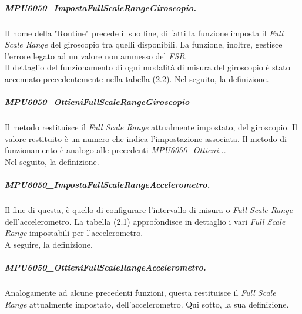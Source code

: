 \documentclass[11pt]{report}
\begin{document}
\subparagraph{MPU6050\_ImpostaFullScaleRangeGiroscopio.}
Il nome della "Routine" precede il suo fine, di fatti la funzione imposta il \textit{Full Scale Range} del giroscopio tra quelli disponibili. La funzione, inoltre, gestisce l'errore legato ad un valore non ammesso del \textit{FSR}.\\
Il dettaglio del funzionamento di ogni modalità di misura del giroscopio è stato accennato precedentemente nella tabella (2.2).
Nel seguito, la definizione.


\subparagraph{MPU6050\_OttieniFullScaleRangeGiroscopio}
Il metodo restituisce il \textit{Full Scale Range} attualmente impostato, del giroscopio. Il valore restituito è un numero che indica l'impostazione associata. Il metodo di funzionamento è analogo alle precedenti \textit{MPU6050\_Ottieni...}\\
Nel seguito, la definizione.

\subparagraph{MPU6050\_ImpostaFullScaleRangeAccelerometro.}
Il fine di questa, è quello di configurare l'intervallo di misura o \textit{Full Scale Range} dell'accelerometro. La tabella (2.1) approfondisce in dettaglio i vari \textit{Full Scale Range} impostabili per l'accelerometro.\\
A seguire, la definizione.


\subparagraph{MPU6050\_OttieniFullScaleRangeAccelerometro.}
Analogamente ad alcune precedenti funzioni, questa restituisce il \textit{Full Scale Range} attualmente impostato, dell'accelerometro.
Qui sotto, la sua definizione.

\end{document}
